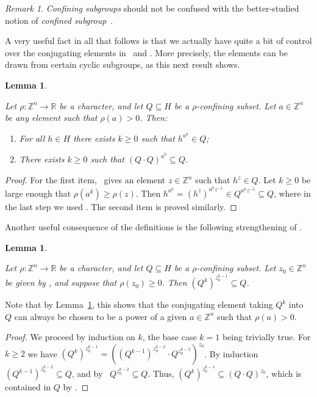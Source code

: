 \documentclass[10pt,a4paper]{article}
\newtheorem{lemm}[cdrthm]{Lemma}
\theoremstyle{definition}
\theoremstyle{remark}
\newtheorem{rema}[cdrthm]{Remark}
\newcommand{\Z}{\mathbb{Z}}
\newcommand{\R}{\mathbb{R}}
\theoremstyle{plain}
\begin{document}
\begin{rema}
    \emph{Confining subgroups} should not be confused with the better-studied notion of \emph{confined subgroup}~\cite{confined:subgroup}.
\end{rema}

A very useful fact in all that follows is that we actually have quite a bit of control over the conjugating elements in \GetInConf\ and \ProdConf. More precisely, the elements can be drawn from certain cyclic subgroups, as this next result shows.

\begin{lemm}
\label{lem:conf:cyclic}

Let $\rho \colon \Z^n \to \R$ be a character, and let $Q \subseteq H$ be a $\rho$-confining subset. Let $a \in \Z^n$ be any element such that $\rho(a) > 0$. Then:
\begin{enumerate}
\item For all $h \in H$ there exists $k \geq 0$ such that $h^{a^k} \in Q$;
\item There exists $k \geq 0$ such that $(Q \cdot Q)^{a^k} \subseteq Q$.
\end{enumerate}
\end{lemm}

\begin{proof}
For the first item, \GetInConf\ gives an element $z \in \Z^n$ such that $h^z \in Q$. Let $k \geq 0$ be large enough that $\rho(a^k) \geq \rho(z)$. Then $h^{a^k} = (h^z)^{a^k z^{-1}} \in Q^{a^k z^{-1}} \subseteq Q$, where in the last step we used \StayInConf. The second item is proved similarly.
\end{proof}

Another useful consequence of the definitions is the following strengthening of \ProdConf.

\begin{lemm}
\label{lem:products}

Let $\rho \colon \Z^n \to \R$ be a character, and let $Q \subseteq H$ be a $\rho$-confining subset. Let $z_0 \in \Z^n$ be given by \ProdConf, and suppose that $\rho(z_0) \geq 0$. Then $(Q^k)^{z_0^{k-1}} \subseteq Q$.
\end{lemm}

Note that by Lemma~\ref{lem:conf:cyclic}, this shows that the conjugating element taking $Q^k$ into $Q$ can always be chosen to be a power of a given $a \in \Z^n$ such that $\rho(a) > 0$.

\begin{proof}
We proceed by induction on $k$, the base case $k=1$ being trivially true. For $k\ge 2$ we have $(Q^k)^{z_0^{k-1}} = ((Q^{k-1})^{z_0^{k-2}} \cdot Q^{z_0^{k-2}})^{z_0}$. By induction $(Q^{k-1})^{z_0^{k-2}}\subseteq Q$, and by \StayInConf\ $Q^{z_0^{k-2}}\subseteq Q$. Thus, $(Q^k)^{z_0^{k-1}}\subseteq (Q \cdot Q)^{z_0}$, which is contained in $Q$ by \ProdConf.
\end{proof}
\end{document}
